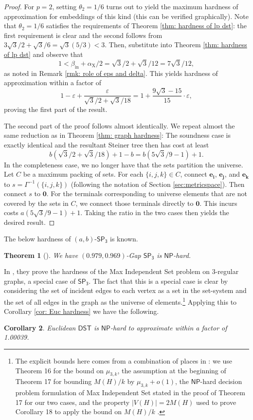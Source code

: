 \documentclass{article}\providecommand{\DeclareRedundantLanguages}[2]{}\usepackage[a4paper,margin=20mm]{geometry}
\newtheorem{theorem}{Theorem}\newtheorem{lemma}[theorem]{Lemma}\newtheorem{proposition}[theorem]{Proposition}\newtheorem{corollary}[theorem]{Corollary}\newtheorem{definition}[theorem]{Definition}\newtheorem{claim}[theorem]{Claim}\newtheorem{remark}[theorem]{Remark}\newtheorem{observation}[theorem]{Observation}\newtheorem{conjecture}[theorem]{Conjecture}\newtheorem{example}[theorem]{Example}
\newcommand{\1}{\textbf{1}}
\newcommand{\setpT}{$\mathsf{SP_3}$\xspace}
\newcommand{\dst}{$\mathsf{DST}$\xspace}
\newcommand{\np}{$\mathsf{NP}$\xspace}
\newcommand{\srd}{\alpha_{\text{X}}}
\begin{document}
\begin{proof}
For $p = 2$, setting $\theta_2 = 1/6$ turns out to yield the maximum hardness of approximation for embeddings of this kind (this can be verified graphically). Note that $\theta_2 = 1/6$ satisfies the requirements of Theorem \ref{thm: hardness of lp dst}: the first requirement is clear and the second follows from $3\sqrt{3}/2 + \sqrt{3}/6 = \sqrt{3}(5/3) < 3$. Then, substitute into Theorem \ref{thm: hardness of lp dst} and observe that
\[
1 < \beta_{\text{in}} + \srd/2 = \sqrt{3}/2 + \sqrt{3}/12 = 7\sqrt{3}/12,
\]
as noted in Remark \ref{rmk: role of eps and delta}. This yields hardness of approximation within a factor of 
\[
1 - \varepsilon + \frac{\varepsilon}{\sqrt{3}/2 + \sqrt{3}/18} = 1 + \frac{9\sqrt{3} -15}{15} \cdot \varepsilon,
\]
proving the first part of the result.

The second part of the proof follows almost identically. We repeat almost the same reduction as in Theorem \ref{thm: graph hardness}: The soundness case is exactly identical and the resultant Steiner tree then has cost at least 
\[
b(\sqrt{3}/2 + \sqrt{3}/18) + 1 - b = b(5\sqrt{3}/9 -1) + 1.
\]
In the completeness case, we no longer have that the sets partition the universe. Let $C$ be a maximum packing of sets. For each $\{i,j,k\} \in C$, connect $\mathbf{e_i}$, $\mathbf{e_j}$, and $\mathbf{e_k}$ to $s = \Gamma^{-1}(\{i,j,k\})$  (following the notation of Section \ref{sec:metricspace}).  Then connect $s$ to $\mathbf{0}$. For the terminals corresponding to universe elements that are not covered by the sets in $C$, we connect those terminals directly to $\mathbf{0}$. This incurs costs $a(5\sqrt{3}/9 - 1) + 1$. Taking the ratio in the two cases then yields the desired result.
\end{proof}

The below hardness of $(a,b)$-\setpT is known.
\begin{theorem}[\cite{Chlebik_Chlebikova_2006}] \label{thm: IS hardness}
We have $(0.979,0.969)$-Gap \setpT is \np-hard.
\end{theorem}
In \cite{Chlebik_Chlebikova_2006}, they prove the hardness of the Max Independent Set problem on $3$-regular graphs, a special case of \setpT. The fact that this is a special case is clear by considering the set of incident edges to each vertex as a set in the set-system and the set of all edges in the graph as the universe of elements.\footnote{The explicit bounds here comes from a combination of places in \cite{Chlebik_Chlebikova_2006}: we use Theorem 16 for the bound on $\mu_{3,k}$, the assumption at the beginning of Theorem 17 for bounding $M(H)/k$ by $\mu_{3, k} + o(1)$, the \np-hard decision problem formulation of Max Independent Set stated in the proof of Theorem 17 for our two cases, and the property $|V(H)| = 2M(H)$ used to prove Corollary 18 to apply the bound on $M(H)/k$ .}
Applying this to Corollary \ref{cor: Euc hardness} we have the following.
\begin{corollary}
Euclidean \dst is \np-hard to approximate within a factor of 1.00039.
\end{corollary}
\end{document}
